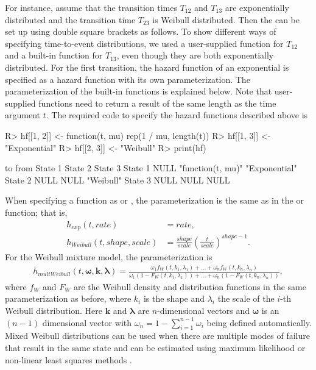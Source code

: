 For instance, assume that the transition times $T_{12}$ and $T_{13}$ are exponentially distributed and the transition time $T_{23}$ is Weibull distributed. Then the  can be set up using double square brackets as follows. 
To show different ways of specifying time-to-event distributions, we used a user-supplied function for $T_{12}$ and a built-in function for $T_{13}$, even though they are both exponentially distributed. 
For the first transition, the hazard function of an exponential is specified as a hazard function with its own parameterization. The parameterization of the built-in functions is explained below. Note that user-supplied functions need to return a result of the same length as the time argument $t$. The required code to specify the hazard functions described above is
\begin{Schunk}
\begin{Sinput}
R>   hf[[1, 2]] <- function(t, mu) rep(1 / mu, length(t))
R>   hf[[1, 3]] <- "Exponential"
R>   hf[[2, 3]] <- "Weibull"
R>   print(hf)
\end{Sinput}
\begin{Soutput}
         to
from      State 1 State 2           State 3      
  State 1 NULL    "function(t, mu)" "Exponential"
  State 2 NULL    NULL              "Weibull"    
  State 3 NULL    NULL              NULL         
\end{Soutput}
\end{Schunk}
When specifying a function as  or , the parameterization is the same as in the  or  function; that is,
\begin{align} \label{eqn:ExpWeib_param}
  h_{exp}(t, rate) &= rate, \\
  h_{Weibull}(t, shape, scale) &= \frac{shape}{scale} \left( \frac{t}{scale} \right)^{shape-1}. 
\end{align}
For the Weibull mixture model, the parameterization is
\begin{align} \label{eqn:MultWeib_param}
  h_{multWeibull}(t, \bm\omega, \mathbf{k}, \bm\lambda) = 
    \frac{\omega_1 f_W(t, k_1,  \lambda_1) + \dots + \omega_n f_W(t, k_n, \lambda_n)}
    {\omega_1 (1-F_W(t, k_1, \lambda_1)) + \dots + \omega_n (1-F_W(t, k_n, \lambda_n))}, 
\end{align}
where $f_W$ and $F_W$ are the Weibull density and distribution functions in the same parameterization as before, where $k_i$ is the shape and $\lambda_i$ the scale of the $i$-th Weibull distribution. Here $\mathbf{k}$ and $\bm\lambda$ are $n$-dimensional vectors and $\bm\omega$ is an $(n-1)$ dimensional vector with $\omega_n = 1-\sum_{i=1}^{n-1} \omega_i$ being defined automatically. Mixed Weibull distributions can be used when there are multiple modes of failure that result in the same state and can be estimated using maximum likelihood or non-linear least squares methods \citep{Ling2009}.

